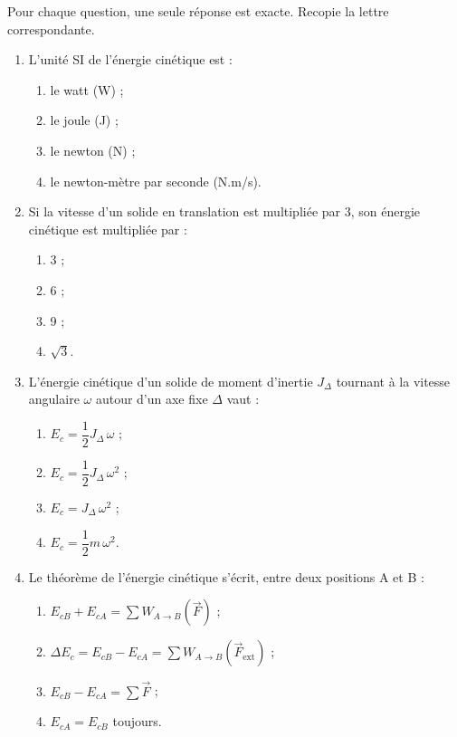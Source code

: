 \documentclass[11pt]{article}
\begin{document}
\begin{exercice}
Pour chaque question, une seule réponse est exacte. Recopie la lettre correspondante.
\begin{enumerate}
\item L'unité SI de l'énergie cinétique est :
\begin{enumerate}
\item le watt (W) ;
\item le joule (J) ;
\item le newton (N) ;
\item le newton-mètre par seconde (N.m/s).
\end{enumerate}
\item Si la vitesse d'un solide en translation est multipliée par 3, son énergie cinétique est multipliée par :
\begin{enumerate}
\item 3 ;
\item 6 ;
\item 9 ;
\item $\sqrt{3}$.
\end{enumerate}
\item L'énergie cinétique d'un solide de moment d'inertie $J_{\Delta}$ tournant à la vitesse angulaire $\omega$ autour d'un axe fixe $\Delta$ vaut :
\begin{enumerate}
\item $E_c = \dfrac{1}{2}J_{\Delta}\,\omega$ ;
\item $E_c = \dfrac{1}{2}J_{\Delta}\,\omega^2$ ;
\item $E_c = J_{\Delta}\,\omega^2$ ;
\item $E_c = \dfrac{1}{2}m\,\omega^2$.
\end{enumerate}
\item Le théorème de l'énergie cinétique s'écrit, entre deux positions A et B :
\begin{enumerate}
\item $E_{cB} + E_{cA} = \sum W_{A\to B}(\vec{F})$ ;
\item $\Delta E_c = E_{cB} - E_{cA} = \sum W_{A\to B}(\vec{F}_{\text{ext}})$ ;
\item $E_{cB} - E_{cA} = \sum \vec{F}$ ;
\item $E_{cA} = E_{cB}$ toujours.
\end{enumerate}
\end{enumerate}
\end{exercice}
\end{document}
